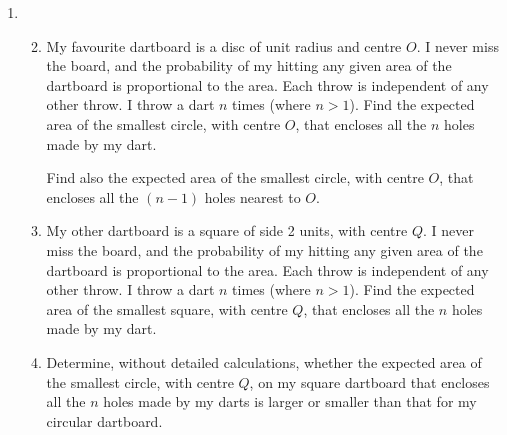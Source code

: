\documentclass[a4, 11pt]{report}
\newlength{\qspace}
\newcounter{qnumber}
\newenvironment{question}%
 {\vspace{\qspace}
  \begin{enumerate}[\bfseries 1\quad][10]%
    \setcounter{enumi}{\value{qnumber}}%
    \item%
 }
{
  \end{enumerate}
  \filbreak
  \stepcounter{qnumber}
 }
\newenvironment{questionparts}[1][1]%
 {
  \begin{enumerate}[\bfseries (i)]%
    \setcounter{enumii}{#1}
    \addtocounter{enumii}{-1}
    \setlength{\itemsep}{5mm}
    \setlength{\parskip}{8pt}
 }
 {
  \end{enumerate}
 }
\begin{document}
\begin{question}
\begin{questionparts}
\item
My favourite dartboard is  a disc of unit radius and centre $O$. 
I never miss the board, and the probability of my hitting 
any given area of the dartboard is proportional to the area.
Each throw is independent of any other throw.
I throw a dart $n$ times (where $n>1$). Find the expected area of the 
smallest circle, with centre $O$, that encloses all
the $n$ holes made by my dart.


 Find also the expected area of the 
smallest circle, with centre $O$, that encloses all
the  $(n-1)$ holes nearest to $O$.

\item
My other dartboard is a square of side 2 units, with centre
$Q$. I never miss the board, and the probability of my hitting 
any given area of the dartboard is proportional to the area.
Each throw is independent of any other throw.
I 
throw a dart $n$ times (where $n>1$).  
 Find the expected area of the 
smallest square, with centre $Q$, that encloses all
the $n$ holes made by my dart.

\item
Determine,
without detailed calculations, whether 
the expected area of the 
smallest circle, with centre $Q$, on my square dartboard 
that encloses all
the $n$ holes made by my darts
is larger or
smaller than that for my circular dartboard.
\end{questionparts}
\end{question}
	
\end{document}
